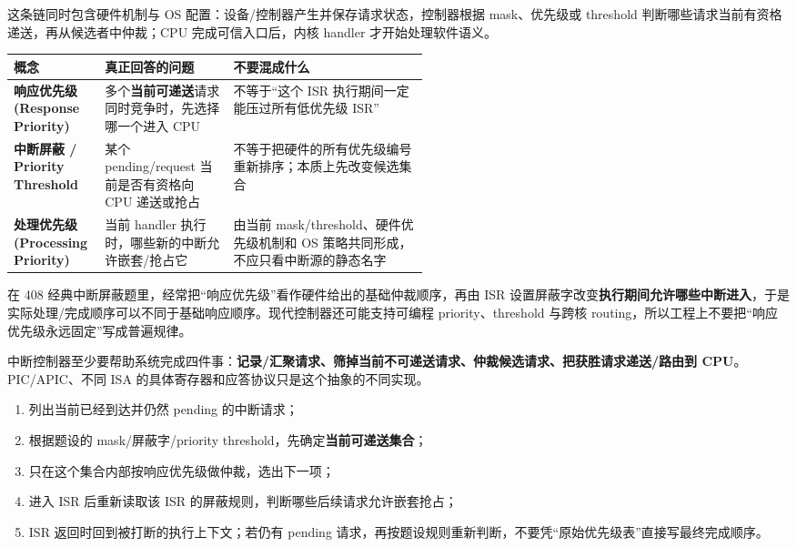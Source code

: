 \documentclass[11pt,a4paper]{ctexart}
\newcommand{\kw}[1]{\textbf{#1}}
\begin{document}
这条链同时包含硬件机制与 OS 配置：设备/控制器产生并保存请求状态，控制器根据 mask、优先级或 threshold 判断哪些请求当前有资格递送，再从候选者中仲裁；CPU 完成可信入口后，内核 handler 才开始处理软件语义。

\begingroup
\small
\renewcommand{\arraystretch}{1.25}
\setlength{\tabcolsep}{5pt}
\begin{tabularx}{\linewidth}{>{\bfseries}p{0.22\linewidth} >{\raggedright\arraybackslash}p{0.31\linewidth} X}
\toprule
概念 & 真正回答的问题 & 不要混成什么\\
\midrule
响应优先级 (Response Priority) & 多个\kw{当前可递送}请求同时竞争时，先选择哪一个进入 CPU & 不等于“这个 ISR 执行期间一定能压过所有低优先级 ISR”\\
中断屏蔽 / Priority Threshold & 某个 pending/request 当前是否有资格向 CPU 递送或抢占 & 不等于把硬件的所有优先级编号重新排序；本质上先改变候选集合\\
处理优先级 (Processing Priority) & 当前 handler 执行时，哪些新的中断允许嵌套/抢占它 & 由当前 mask/threshold、硬件优先级机制和 OS 策略共同形成，不应只看中断源的静态名字\\
\bottomrule
\end{tabularx}
\endgroup

在 408 经典中断屏蔽题里，经常把“响应优先级”看作硬件给出的基础仲裁顺序，再由 ISR 设置屏蔽字改变\kw{执行期间允许哪些中断进入}，于是实际处理/完成顺序可以不同于基础响应顺序。现代控制器还可能支持可编程 priority、threshold 与跨核 routing，所以工程上不要把“响应优先级永远固定”写成普遍规律。

\begin{corebox}[控制器的最小职责模型]
中断控制器至少要帮助系统完成四件事：\kw{记录/汇聚请求、筛掉当前不可递送请求、仲裁候选请求、把获胜请求递送/路由到 CPU}。PIC/APIC、不同 ISA 的具体寄存器和应答协议只是这个抽象的不同实现。
\end{corebox}

\begin{exam}
\begin{enumerate}
  \item 列出当前已经到达并仍然 pending 的中断请求；
  \item 根据题设的 mask/屏蔽字/priority threshold，先确定\kw{当前可递送集合}；
  \item 只在这个集合内部按响应优先级做仲裁，选出下一项；
  \item 进入 ISR 后重新读取该 ISR 的屏蔽规则，判断哪些后续请求允许嵌套抢占；
  \item ISR 返回时回到被打断的执行上下文；若仍有 pending 请求，再按题设规则重新判断，不要凭“原始优先级表”直接写最终完成顺序。
\end{enumerate}
\end{exam}
\end{document}
